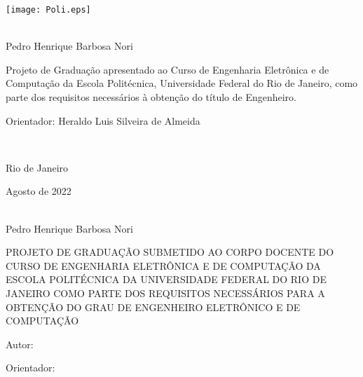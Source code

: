 \texttt{[image: Poli.eps]}

\begin{center}
\large{\titulo{}}\\
   \vspace{1cm}
\large{Pedro Henrique Barbosa Nori}\\
\end{center}
   \vspace{3cm}
\hspace{7cm}
\hfill \parbox{8.0cm}{Projeto de Graduação apresentado ao Curso de Engenharia Eletrônica e de Computação da Escola Politécnica, Universidade Federal do Rio de Janeiro, como parte dos requisitos necessários à obtenção do título de Engenheiro.\\}
   \vspace{2cm}
\hfill \parbox{8.0cm}{Orientador: Heraldo Luis Silveira de Almeida} \\
   \vspace{2cm}
\begin{center}
Rio de Janeiro

Agosto de 2022
\end{center}


\pagebreak


\begin{center}
\large{\titulo{}}\\
   \vspace{1cm}
\large{Pedro Henrique Barbosa Nori}\\
\end{center}
   \vspace{2cm}
PROJETO DE GRADUAÇÃO SUBMETIDO AO CORPO DOCENTE DO CURSO DE ENGENHARIA ELETRÔNICA E DE COMPUTAÇÃO DA ESCOLA POLITÉCNICA DA UNIVERSIDADE FEDERAL DO RIO DE JANEIRO COMO PARTE DOS REQUISITOS NECESSÁRIOS PARA A OBTENÇÃO DO GRAU DE ENGENHEIRO ELETRÔNICO E DE COMPUTAÇÃO

   \vspace{1cm}
Autor:
      \vspace{0.5cm}
      \begin{flushright}
         \parbox{10cm}{
            \hrulefill

            \vspace{-.375cm}

            \vspace{0.1cm}
         }
      \end{flushright}


Orientador:
      \vspace{0.5cm}
      \begin{flushright}
         \parbox{10cm}{
            \hrulefill

            \vspace{-.375cm}

            \vspace{0.1cm}
         }
      \end{flushright}

